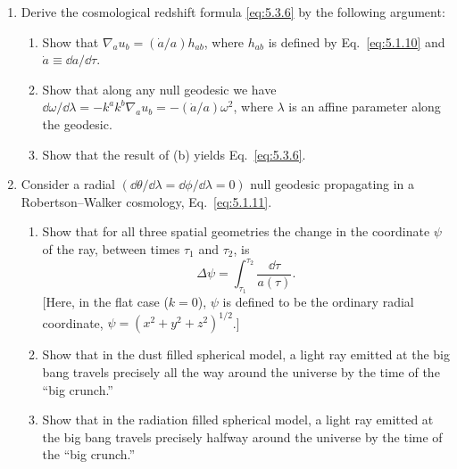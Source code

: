 \begin{enumerate}[label=\arabic*.,leftmargin=*]
\item Derive the cosmological redshift formula \eqref{eq:5.3.6} by the following
argument:
\begin{enumerate}[label=\alph*),leftmargin=2.5em]
\item Show that \(\nabla_a u_b=(\dot a/a)h_{ab}\), where \(h_{ab}\) is defined by
Eq.~\eqref{eq:5.1.10} and \(\dot a\equiv \dd a/\dd\tau\).

\item Show that along any null geodesic we have
\(\dd\omega/\dd\lambda=-k^a k^b\nabla_a u_b=-(\dot a/a)\omega^2\), where \(\lambda\)
is an affine parameter along the geodesic.

\item Show that the result of (b) yields Eq.~\eqref{eq:5.3.6}.
\end{enumerate}

\item Consider a radial \((\dd\theta/\dd\lambda=\dd\phi/\dd\lambda=0)\) null geodesic
propagating in a Robertson--Walker cosmology, Eq.~\eqref{eq:5.1.11}.
\begin{enumerate}[label=\alph*),leftmargin=2.5em]
\item Show that for all three spatial geometries the change in the coordinate \(\psi\)
of the ray, between times \(\tau_1\) and \(\tau_2\), is
\begin{equation*}
  \Delta\psi=\int_{\tau_1}^{\tau_2}\frac{\dd\tau}{a(\tau)}.
\end{equation*}
[Here, in the flat case (\(k=0\)), \(\psi\) is defined to be the ordinary radial
coordinate, \(\psi=(x^2+y^2+z^2)^{1/2}\).]

\item Show that in the dust filled spherical model, a light ray emitted at the big bang
travels precisely all the way around the universe by the time of the ``big crunch.''

\item Show that in the radiation filled spherical model, a light ray emitted at the big
bang travels precisely halfway around the universe by the time of the ``big crunch.''
\end{enumerate}
\end{enumerate}
